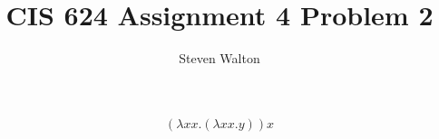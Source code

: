 \documentclass[11pt]{article}
\begin{document}
\title{CIS 624 Assignment 4 Problem 2}
\author{Steven Walton}
\maketitle
$$(\lambda xx.(\lambda xx.y))x $$
\end{document}
